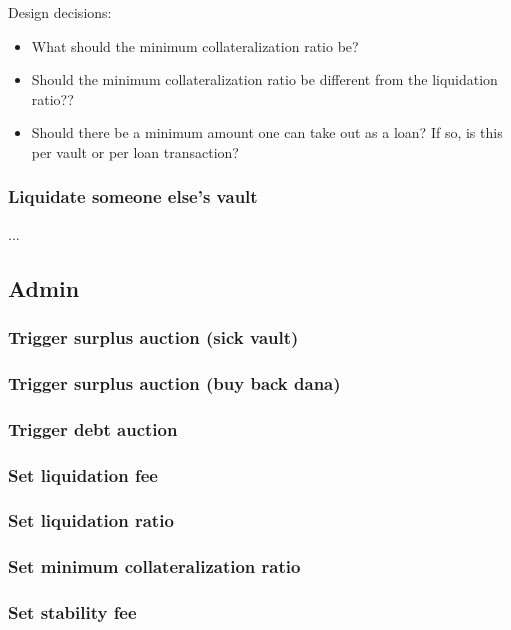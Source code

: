 \documentclass{article} %
\begin{document}
Design decisions:
\begin{itemize}
  \item What should the minimum collateralization ratio be?
  \item Should the minimum collateralization ratio be different from the
    liquidation ratio??
  \item Should there be a minimum amount one can take out as a loan? If so, is
    this per vault or per loan transaction?
\end{itemize}

\subsubsection{Liquidate someone else's vault}

...

\subsection{Admin}

\subsubsection{Trigger surplus auction (sick vault)}

\subsubsection{Trigger surplus auction (buy back dana)}

\subsubsection{Trigger debt auction}

\subsubsection{Set liquidation fee}

\subsubsection{Set liquidation ratio}

\subsubsection{Set minimum collateralization ratio}

\subsubsection{Set stability fee}
\end{document}
